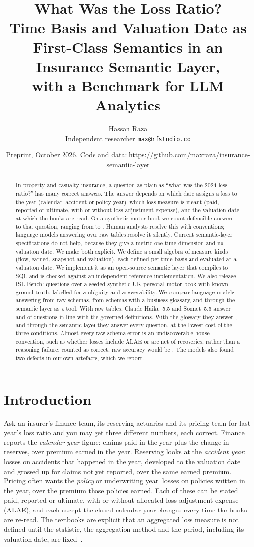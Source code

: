 \documentclass[11pt]{article}
\title{What Was the Loss Ratio?\\[4pt]
\large Time Basis and Valuation Date as First-Class Semantics in an Insurance Semantic Layer,\\
with a Benchmark for LLM Analytics}
\author{Hassan Raza\\ \small Independent researcher \quad \texttt{max@rfstudio.co}}
\date{\small Preprint, October 2026. Code and data: \url{https://github.com/maxraza/insurance-semantic-layer}}
\newcommand{\ResultsAbstract}{With raw tables, Claude Haiku~5.5 and Sonnet~5.5 answer \AccHaikuRaw{} and
\AccSonnetRaw{} of questions in line with the governed definitions. With the glossary they answer \AccHaikuDocs{},
and through the semantic layer they answer every question, at the lowest cost of the three conditions. Almost every
raw-schema error is an undiscoverable house convention, such as whether losses include ALAE or are net of
recoveries, rather than a reasoning failure: counted as correct, raw accuracy would be \AdjRawHaiku{}. The models
also found two defects in our own artefacts, which we report.}
\begin{document}
\maketitle

\begin{abstract}
In property and casualty insurance, a question as plain as ``what was the 2024 loss ratio?'' has many correct
answers. The answer depends on which date assigns a loss to the year (calendar, accident or policy year), which
loss measure is meant (paid, reported or ultimate, with or without loss adjustment expense), and the valuation
date at which the books are read. On a synthetic motor book we count \HeadlineCount{} defensible answers to that
question, ranging from \HeadlineMin{} to \HeadlineMax{}. Human analysts resolve this with conventions;
language models answering over raw tables resolve it silently. Current semantic-layer specifications do not
help, because they give a metric one time dimension and no valuation date. We make both explicit. We define
a small algebra of measure kinds (flow, earned, snapshot and valuation), each defined per time basis and
evaluated at a valuation date. We implement it as an open-source semantic layer that compiles to SQL and is
checked against an independent reference implementation. We also release ISL-Bench: \BenchQuestions{}
questions over a seeded synthetic UK personal-motor book with known ground truth, labelled for ambiguity and
answerability. We compare language models answering from raw schemas, from schemas with a business glossary,
and through the semantic layer as a tool. \ResultsAbstract{}
\end{abstract}

\section{Introduction}

Ask an insurer's finance team, its reserving actuaries and its pricing team for last year's loss ratio and you
may get three different numbers, each correct. Finance reports the \emph{calendar-year} figure: claims paid in
the year plus the change in reserves, over premium earned in the year. Reserving looks at the \emph{accident
year}: losses on accidents that happened in the year, developed to the valuation date and grossed up for claims
not yet reported, over the same earned premium. Pricing often wants the \emph{policy} or underwriting year:
losses on policies written in the year, over the premium those policies earned. Each of these can be stated paid,
reported or ultimate, with or without allocated loss adjustment expense (ALAE), and each except the closed
calendar year changes every time the books are re-read. The textbooks are explicit that an aggregated loss
measure is not defined until the statistic, the aggregation method and the period, including its valuation
date, are fixed~\cite{werner2016basic,friedland2010estimating}.
\end{document}
